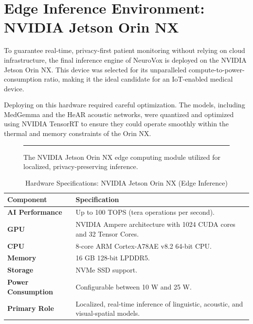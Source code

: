 \documentclass[BTech]{iitmdiss}
\begin{document}
\section{Edge Inference Environment: NVIDIA Jetson Orin NX}
To guarantee real-time, privacy-first patient monitoring without relying on cloud infrastructure, the final inference engine of NeuroVox is deployed on the NVIDIA Jetson Orin NX. This device was selected for its unparalleled compute-to-power-consumption ratio, making it the ideal candidate for an IoT-enabled medical device.

Deploying on this hardware required careful optimization. The models, including MedGemma and the HeAR acoustic networks, were quantized and optimized using NVIDIA TensorRT to ensure they could operate smoothly within the thermal and memory constraints of the Orin NX.

\begin{figure}[htbp]
    \centering
    \rule{0.6\textwidth}{5cm} %
    \caption{The NVIDIA Jetson Orin NX edge computing module utilized for localized, privacy-preserving inference.}
    \label{fig:jetson_hardware}
\end{figure}

\begin{table}[htbp]
\centering
\caption{Hardware Specifications: NVIDIA Jetson Orin NX (Edge Inference)}
\label{tab:jetson_specs}
\renewcommand{\arraystretch}{1.3}
\begin{tabularx}{\textwidth}{p{4.5cm} X}
\toprule
\textbf{Component} & \textbf{Specification} \\
\midrule
\textbf{AI Performance} & Up to 100 TOPS (tera operations per second). \\
\textbf{GPU} & NVIDIA Ampere architecture with 1024 CUDA cores and 32 Tensor Cores. \\
\textbf{CPU} & 8-core ARM Cortex-A78AE v8.2 64-bit CPU. \\
\textbf{Memory} & 16 GB 128-bit LPDDR5. \\
\textbf{Storage} & NVMe SSD support. \\
\textbf{Power Consumption} & Configurable between 10 W and 25 W. \\
\textbf{Primary Role} & Localized, real-time inference of linguistic, acoustic, and visual-spatial models. \\
\bottomrule
\end{tabularx}
\end{table}
\end{document}
